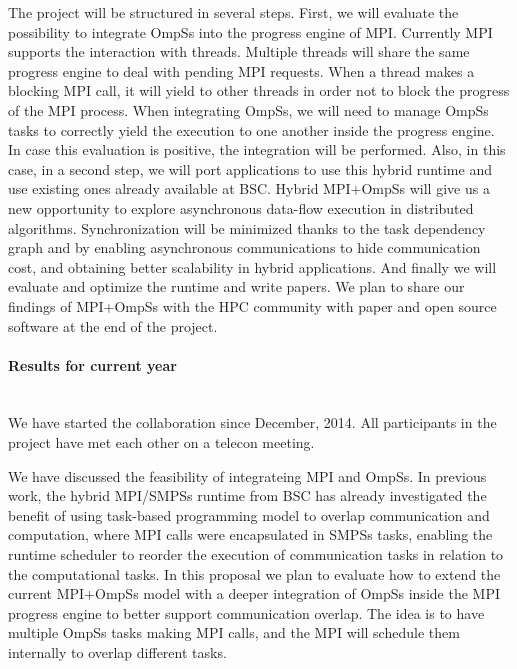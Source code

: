 The project will be structured in several steps. First, we will evaluate the
possibility to integrate OmpSs into the progress engine of MPI. Currently MPI
supports the interaction with threads. Multiple threads will share the same
progress engine to deal with pending MPI requests.  When a thread makes a
blocking MPI call, it will yield to other threads in order not to block the
progress of the MPI process. When integrating OmpSs, we will need to manage
OmpSs tasks to correctly yield the execution to one another inside the progress
engine. In case this evaluation is positive, the integration will be performed.
Also, in this case, in a second step, we will port applications to use this
hybrid runtime and use existing ones already available at BSC. Hybrid MPI+OmpSs
will give us a new opportunity to explore asynchronous data-flow execution in
distributed algorithms. Synchronization will be minimized  thanks to the task
dependency graph and by enabling asynchronous communications to hide
communication cost, and obtaining better scalability in hybrid applications.
And finally we will evaluate and optimize the runtime and write papers. We plan
to share our findings of MPI+OmpSs with the HPC community with paper and open
source software at the end of the project.

\paragraph{Results for current year}~\\

We have started the collaboration since December, 2014. All participants in the
project have met each other on a telecon meeting.

We have discussed the feasibility of integrateing MPI and OmpSs. In previous
work, the hybrid MPI/SMPSs runtime from BSC has already investigated the
benefit of using task-based programming model to overlap communication and
computation, where MPI calls were encapsulated in SMPSs tasks, enabling the
runtime scheduler to reorder the execution of communication tasks in relation
to the computational tasks. In this proposal we plan to evaluate how to extend
the current MPI+OmpSs model  with a deeper integration of OmpSs inside the MPI
progress engine to better support communication overlap. The idea is to have
multiple OmpSs tasks making MPI calls, and the MPI will schedule them
internally to overlap different tasks.

